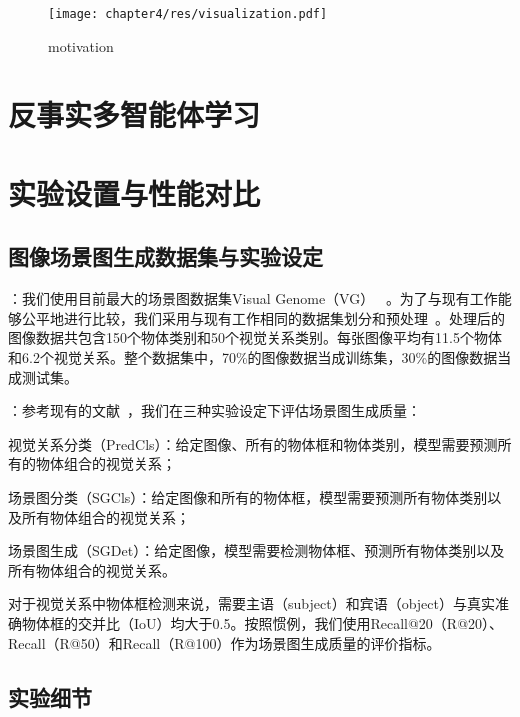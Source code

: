 \begin{figure}[htbp]
    \centering
    \texttt{[image: chapter4/res/visualization.pdf]}
    \caption{motivation}
    \label{xx}
\end{figure}



\section{反事实多智能体学习}

\section{实验设置与性能对比}
\subsection{图像场景图生成数据集与实验设定}

：我们使用目前最大的场景图数据集Visual Genome（VG） ~\cite{krishna2017visual}。为了与现有工作能够公平地进行比较，我们采用与现有工作相同的数据集划分和预处理~\cite{xu2017scene, zellers2018neural, newell2017pixels, yang2018graph, herzig2018mapping}。处理后的图像数据共包含150个物体类别和50个视觉关系类别。每张图像平均有11.5个物体和6.2个视觉关系。整个数据集中，70\%的图像数据当成训练集，30\%的图像数据当成测试集。


：参考现有的文献~\cite{xu2017scene, zellers2018neural, jae2018tensorize}，我们在三种实验设定下评估场景图生成质量：
\begin{asparaenum}
\item 视觉关系分类（PredCls）：给定图像、所有的物体框和物体类别，模型需要预测所有的物体组合的视觉关系；

\item 场景图分类（SGCls）：给定图像和所有的物体框，模型需要预测所有物体类别以及所有物体组合的视觉关系；

\item 场景图生成（SGDet）：给定图像，模型需要检测物体框、预测所有物体类别以及所有物体组合的视觉关系。
\end{asparaenum}

对于视觉关系中物体框检测来说，需要主语（subject）和宾语（object）与真实准确物体框的交并比（IoU）均大于0.5。按照惯例，我们使用Recall@20（R@20）、Recall（R@50）和Recall（R@100）作为场景图生成质量的评价指标。


\subsection{实验细节}


